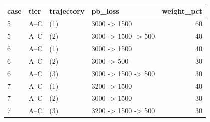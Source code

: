 \begin{tabular}{llllr}
\toprule
case & tier & trajectory & pb\_loss & weight\_pct \\
\midrule
5 & A--C & (1) & 3000 -> 1500 & 60 \\
5 & A--C & (2) & 3000 -> 1500 -> 500 & 40 \\
6 & A--C & (1) & 3000 -> 1500 & 40 \\
6 & A--C & (2) & 3000 -> 500 & 30 \\
6 & A--C & (3) & 3000 -> 1500 -> 500 & 30 \\
7 & A--C & (1) & 3200 -> 1500 & 40 \\
7 & A--C & (2) & 3000 -> 1500 & 30 \\
7 & A--C & (3) & 3200 -> 1500 -> 500 & 30 \\
\bottomrule
\end{tabular}
